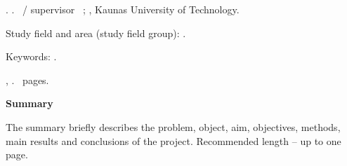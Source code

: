 
\begin{otherlanguage}{english}
\begin{titlepage}

\projectAuthorNameEN. \projectTitleEN. \projectTypeEN\ / supervisor \projectSupervisorPositionEN\ \projectSupervisorNameEN; \projectFacultyEN, Kaunas University of Technology.

Study field and area (study field group): \projectStudyFieldAndAreaEN.

Keywords: \projectKeywordsEN.

\projectCity, \projectYear. \pageref{LastPage}~pages.

\vspace{0.5cm}
\begin{center}
  \textbf{Summary}
\end{center}

The summary briefly describes the problem, object, aim, objectives, methods, main results and conclusions of the project. Recommended length -- up to one page.

\lipsum[1-2]

\end{titlepage}
\end{otherlanguage}
